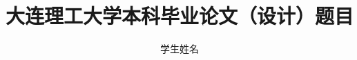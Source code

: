 \documentclass{wsnex-dut-bachelor}
\title{大连理工大学本科毕业论文（设计）题目}
\author{学生姓名}
\begin{document}
\makecover
\makedeclarations

\frontmatter

\tableofcontents

\mainmatter






\appendix


\backmatter


\end{document}
